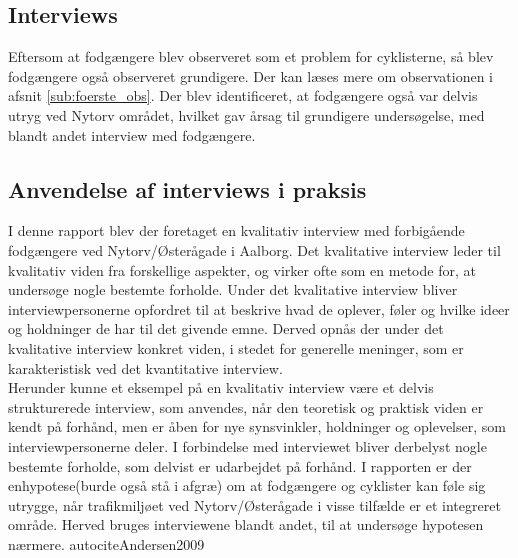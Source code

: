 \subsection{Interviews}
Eftersom at fodgængere blev observeret som et problem for cyklisterne, så blev fodgængere også observeret grundigere. Der kan læses mere om observationen i afsnit \ref{sub:foerste_obs}. Der blev identificeret, at fodgængere også var delvis utryg ved Nytorv området, hvilket gav årsag til grundigere undersøgelse, med blandt andet interview med fodgængere.%


\subsection{Anvendelse af interviews i praksis}
I denne rapport blev der foretaget en kvalitativ interview med forbigående fodgængere ved Nytorv/Østerågade i Aalborg. Det kvalitative interview leder til kvalitativ viden fra forskellige aspekter, og virker ofte som en metode for, at undersøge nogle bestemte forholde. Under det kvalitative interview bliver interviewpersonerne opfordret til at beskrive hvad de oplever, føler og hvilke ideer og holdninger de har til det givende emne. Derved opnås der under det kvalitative interview konkret viden, i stedet for generelle meninger, som er karakteristisk ved det kvantitative interview. \autocite{Kvale2009}
\\
Herunder kunne et eksempel på en kvalitativ interview være et delvis strukturerede interview, som anvendes, når den teoretisk og praktisk viden er kendt på forhånd, men er åben for nye synsvinkler, holdninger og oplevelser, som interviewpersonerne deler. I forbindelse med interviewet bliver derbelyst nogle bestemte forholde, som delvist er udarbejdet på forhånd. I rapporten er der enhypotese(burde også stå i afgræ) om at fodgængere og cyklister kan føle sig utrygge, når trafikmiljøet ved Nytorv/Østerågade i visse tilfælde er et integreret område. Herved bruges interviewene blandt andet, til at undersøge hypotesen nærmere. autocite{Andersen2009}
\\

